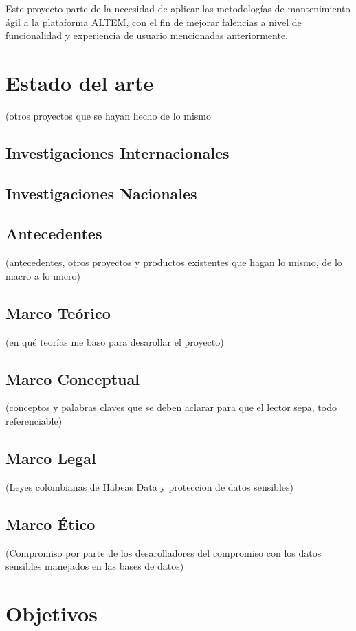 Este proyecto parte de la necesidad de aplicar las metodologías de mantenimiento ágil a la plataforma ALTEM, con el fin de mejorar falencias a nivel de funcionalidad y experiencia de usuario mencionadas anteriormente.

\section{Estado del arte}

(otros proyectos que se hayan hecho de lo mismo

\subsection{Investigaciones Internacionales}
\subsection{Investigaciones Nacionales}

\subsection{Antecedentes}
(antecedentes, otros proyectos y productos existentes que hagan lo mismo, de lo macro a lo micro)
\subsection{Marco Teórico}
(en qué teorías me baso para desarollar el proyecto)
\subsection{Marco Conceptual}
(conceptos y palabras claves que se deben aclarar para que el lector sepa, todo referenciable)
\subsection{Marco Legal}
(Leyes colombianas de Habeas Data y proteccion de datos sensibles)
\subsection{Marco Ético}
(Compromiso por parte de los desarolladores del compromiso con los datos sensibles manejados en las bases de datos)
\section{Objetivos}

